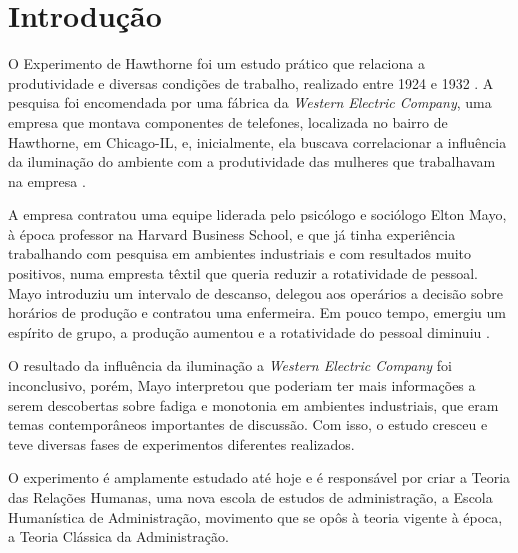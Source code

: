 \section{
	Introdução
}

\setlength{\parindent}{4em}
\setlength{\parskip}{0.5em}
\renewcommand{\baselinestretch}{1}

O Experimento de Hawthorne foi um estudo prático que relaciona a produtividade e diversas condições de trabalho, realizado entre 1924 e 1932 \cite{chiavenato2003introduccao}. A pesquisa foi encomendada por uma fábrica da \textit{Western Electric Company}, uma empresa que montava componentes de telefones, localizada no bairro de Hawthorne, em Chicago-IL, e, inicialmente, ela buscava correlacionar a influência da iluminação do ambiente com a produtividade das mulheres que trabalhavam na empresa \cite{mayo2004human}.

A empresa contratou uma equipe liderada pelo psicólogo e sociólogo Elton Mayo, à época professor na Harvard Business School, e que já tinha experiência trabalhando com pesquisa em ambientes industriais e com resultados muito positivos, numa empresta têxtil que queria reduzir a rotatividade de pessoal. Mayo introduziu um intervalo de descanso, delegou aos operários a decisão sobre horários de produção e contratou uma enfermeira. Em pouco tempo, emergiu um espírito de grupo, a produção aumentou e a rotatividade do pessoal diminuiu \cite{chiavenato2003introduccao}.

O resultado da influência da iluminação a \textit{Western Electric Company} foi inconclusivo, porém, Mayo interpretou que poderiam ter mais informações a serem descobertas sobre fadiga e monotonia em ambientes industriais, que eram temas contemporâneos importantes de discussão. Com isso, o estudo cresceu e teve diversas fases de experimentos diferentes realizados.

O experimento é amplamente estudado até hoje e é responsável por criar a Teoria das Relações Humanas, uma nova escola de estudos de administração, a Escola Humanística de Administração, movimento que se opôs à teoria vigente à época, a Teoria Clássica da Administração.


